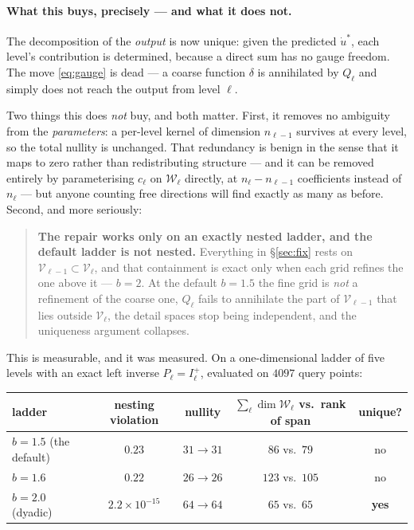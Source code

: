 \documentclass[11pt,a4paper]{article}
\newcommand{\Vs}{\mathcal{V}}
\newcommand{\Ws}{\mathcal{W}}
\begin{document}
\paragraph{What this buys, precisely --- and what it does not.} The decomposition of the
\emph{output} is now unique: given the predicted $\dot u^{*}$, each level's contribution is
determined, because a direct sum has no gauge freedom. The move \eqref{eq:gauge} is dead ---
a coarse function $\delta$ is annihilated by $Q_\ell$ and simply does not reach the output
from level $\ell$.

Two things this does \emph{not} buy, and both matter. First, it removes no ambiguity from
the \emph{parameters}: a per-level kernel of dimension $n_{\ell-1}$ survives at every level,
so the total nullity is unchanged. That redundancy is benign in the sense that it maps to
zero rather than redistributing structure --- and it can be removed entirely by
parameterising $c_\ell$ on $\Ws_\ell$ directly, at $n_\ell - n_{\ell-1}$ coefficients
instead of $n_\ell$ --- but anyone counting free directions will find exactly as many as
before. Second, and more seriously:

\begin{quote}
\textbf{The repair works only on an exactly nested ladder, and the default ladder is not
nested.} Everything in \S\ref{sec:fix} rests on $\Vs_{\ell-1}\subset\Vs_\ell$, and that
containment is exact only when each grid refines the one above it --- $b=2$. At the default
$b=1.5$ the fine grid is \emph{not} a refinement of the coarse one, $Q_\ell$ fails to
annihilate the part of $\Vs_{\ell-1}$ that lies outside $\Vs_\ell$, the detail spaces stop
being independent, and the uniqueness argument collapses.
\end{quote}

\noindent
This is measurable, and it was measured. On a one-dimensional ladder of five levels with an
exact left inverse $P_\ell = I_\ell^{+}$, evaluated on $4097$ query points:

\begin{center}
\begin{tabular}{@{}lcccc@{}}
\toprule
\textbf{ladder} & \textbf{nesting violation} & \textbf{nullity} & $\sum_\ell \dim\Ws_\ell$
  \textbf{vs.\ rank of span} & \textbf{unique?} \\
\midrule
$b=1.5$ (the default) & $0.23$ & $31 \to 31$ & $86$ vs.\ $79$ & no \\
$b=1.6$               & $0.22$ & $26 \to 26$ & $123$ vs.\ $105$ & no \\
$b=2.0$ (dyadic)      & $2.2\times10^{-15}$ & $64 \to 64$ & $65$ vs.\ $65$ & \textbf{yes} \\
\bottomrule
\end{tabular}
\end{center}
\end{document}
